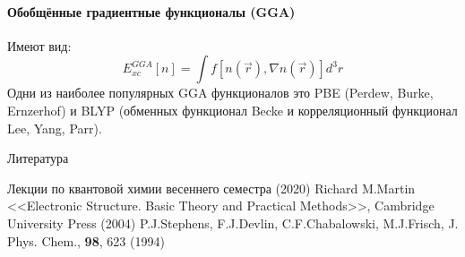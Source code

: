 \documentclass[t]{beamer}  %
\begin{document}
\begin{frame}[shrink=25]{\insertsection}
    \framesubtitle{Обобщённые градиентные функционалы (GGA)}
    Имеют вид:
    \begin{equation}
        E_{x c}^{G G A}[n]=\int f[n(\vec{r}), \nabla n(\vec{r})] d^3 r
    \end{equation}
    Одни из наиболее популярных GGA функционалов это PBE (Perdew, Burke, Ernzerhof) и BLYP (обменных функционал Becke и корреляционный функционал Lee, Yang, Parr). 
    \vspace{5mm}
    

\end{frame}

\begin{frame}{Литература}
    \begin{thebibliography}{10}
         Лекции по квантовой химии весеннего семестра (2020)
         Richard M.Martin <<Electronic Structure. Basic Theory and Practical Methods>>, Cambridge University Press (2004)
         P.J.Stephens, F.J.Devlin, C.F.Chabalowski, M.J.Frisch, J. Phys. Chem., \textbf{98}, 623 (1994) 
    \end{thebibliography}
\end{frame}
\end{document}

